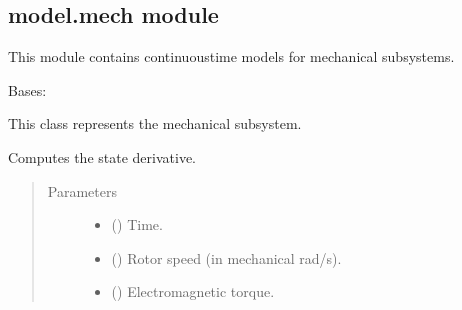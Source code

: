 \documentclass[letterpaper,10pt,english]{sphinxmanual}
\begin{document}
\subsection{model.mech module}
\label{\detokenize{model:module-model.mech}}\label{\detokenize{model:model-mech-module}}
\sphinxAtStartPar
This module contains continuous\sphinxhyphen{}time models for mechanical subsystems.

\begin{fulllineitems}
\label{\detokenize{model:model.mech.Mechanics}}
\pysigstartsignatures
{}
\pysigstopsignatures
\sphinxAtStartPar
Bases: 

\sphinxAtStartPar
This class represents the mechanical subsystem.

\begin{fulllineitems}
\label{\detokenize{model:model.mech.Mechanics.f}}
\pysigstartsignatures
{}
\pysigstopsignatures
\sphinxAtStartPar
Computes the state derivative.
\begin{quote}\begin{description}
\item[{Parameters}] \leavevmode\begin{itemize}
\item {} 
\sphinxAtStartPar
{} () \textendash{} Time.

\item {} 
\sphinxAtStartPar
{} () \textendash{} Rotor speed (in mechanical rad/s).

\item {} 
\sphinxAtStartPar
{} () \textendash{} Electromagnetic torque.


\end{itemize}
\end{description}
\end{quote}
\end{fulllineitems}
\end{fulllineitems}
\end{document}
